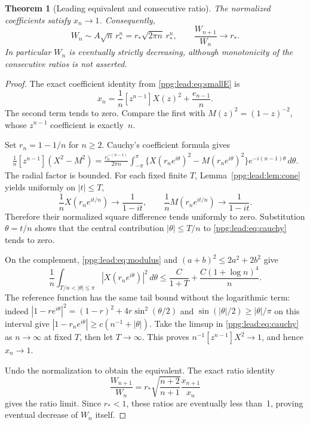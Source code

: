\documentclass[11pt,letterpaper]{article}
\newtheorem{theorem}{Theorem}[section]
\theoremstyle{remark}\newtheorem{remark}[theorem]{Remark}
\numberwithin{equation}{section}
\begin{document}
\begin{theorem}[Leading equivalent and consecutive ratio]\label{ppg:lead:thm:pointwise}
The normalized coefficients satisfy $x_n\to1$. Consequently,
\begin{equation}\label{ppg:lead:eq:pointwise}
 W_n\sim A\sqrt n\,r_*^n=r_*\sqrt{2\pi n}\,r_*^n,
 \qquad \frac{W_{n+1}}{W_n}\longrightarrow r_*.
\end{equation}
In particular $W_n$ is eventually strictly decreasing, although monotonicity of the consecutive ratios is not asserted.
\end{theorem}
\begin{proof}
The exact coefficient identity from \eqref{ppg:lead:eq:smallE} is
\[
 x_n=\frac1n[z^{n-1}]X(z)^2+\frac{e_{n-1}}n.
\]
The second term tends to zero. Compare the first with $M(z)^2=(1-z)^{-2}$, whose $z^{n-1}$ coefficient is exactly~$n$.

Set $r_n=1-1/n$ for $n\ge2$. Cauchy's coefficient formula gives
\begin{align}\label{ppg:lead:eq:cauchy}
 \frac1n[z^{n-1}](X^2-M^2)
 =\frac{r_n^{-(n-1)}}{2\pi n}\int_{-\pi}^{\pi}
 \{X(r_ne^{i\theta})^2-M(r_ne^{i\theta})^2\}
 e^{-i(n-1)\theta}\,d\theta.
\end{align}
The radial factor is bounded. For each fixed finite $T$, Lemma~\ref{ppg:lead:lem:cone} yields uniformly on $|t|\le T$,
\[
 \frac1nX(r_ne^{it/n})\longrightarrow\frac1{1-it},\qquad
 \frac1nM(r_ne^{it/n})\longrightarrow\frac1{1-it}.
\]
Therefore their normalized square difference tends uniformly to zero. Substitution $\theta=t/n$ shows that the central contribution $|\theta|\le T/n$ to \eqref{ppg:lead:eq:cauchy} tends to zero.

On the complement, \eqref{ppg:lead:eq:modulus} and $(a+b)^2\le2a^2+2b^2$ give
\[
 \frac1n\int_{T/n<|\theta|\le\pi}|X(r_ne^{i\theta})|^2\,d\theta
 \le\frac C{1+T}+\frac{C(1+\log n)^4}{n}.
\]
The reference function has the same tail bound without the logarithmic term: indeed
$|1-re^{i\theta}|^2=(1-r)^2+4r\sin^2(\theta/2)$ and
$\sin(|\theta|/2)\ge|\theta|/\pi$ on this interval give
$|1-r_ne^{i\theta}|\ge c(n^{-1}+|\theta|)$.
Take the limsup in \eqref{ppg:lead:eq:cauchy} as $n\to\infty$ at fixed $T$, then let $T\to\infty$. This proves
$n^{-1}[z^{n-1}]X^2\to1$, and hence $x_n\to1$.

Undo the normalization to obtain the equivalent. The exact ratio identity
\[
 \frac{W_{n+1}}{W_n}
 =r_*\sqrt{\frac{n+2}{n+1}}\frac{x_{n+1}}{x_n}
\]
gives the ratio limit. Since $r_*<1$, these ratios are eventually less than~1, proving eventual decrease of $W_n$ itself.
\end{proof}
\end{document}
